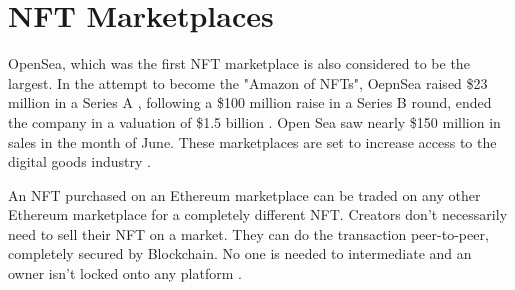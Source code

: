 \documentclass[a4paper, 12pt, oneside]{report}
\begin{document}





\section{NFT Marketplaces}


OpenSea, which was the first NFT marketplace is also considered to be the largest. In the attempt to become the "Amazon of NFTs", OepnSea raised \$23 million in a Series A \autocite{hackett_this_2021}, following a \$100 million raise in a Series B round, ended the company in a valuation of \$1.5 billion \autocite{dfinzer_announcing_2021, matney_nft_2021}. Open Sea saw nearly \$150 million in sales in the month of June.
These marketplaces are set to increase access to the digital goods industry \autocite{chevet_blockchain_2018}.




An NFT purchased on an Ethereum marketplace can be traded on any other Ethereum marketplace for a completely different NFT. Creators don't necessarily need to sell their NFT on a market. They can do the transaction peer-to-peer, completely secured by Blockchain. No one is needed to intermediate and an owner isn't locked onto any platform \autocite{noauthor_erc-721_nodate}.

\end{document}
